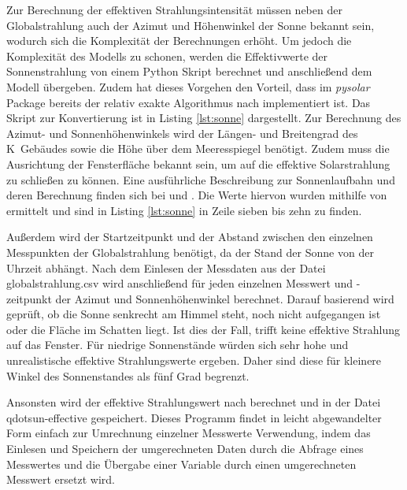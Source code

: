 Zur Berechnung der effektiven Strahlungsintensität müssen neben der Globalstrahlung auch der Azimut und Höhenwinkel der Sonne bekannt sein, wodurch sich die Komplexität der Berechnungen erhöht. Um jedoch die Komplexität des Modells zu schonen, werden die Effektivwerte der Sonnenstrahlung von einem Python Skript berechnet und anschließend dem Modell übergeben. Zudem hat dieses Vorgehen den Vorteil, dass im \textit{pysolar} Package \cite{pysolar} bereits der relativ exakte Algorithmus nach \cite{re08} implementiert ist. 
Das Skript zur Konvertierung ist in Listing \ref{lst:sonne} dargestellt. 
Zur Berechnung des Azimut- und Sonnenhöhenwinkels wird der Längen- und Breitengrad des K~Gebäudes sowie die Höhe über dem Meeresspiegel benötigt. Zudem muss die Ausrichtung der Fensterfläche bekannt sein, um auf die effektive Solarstrahlung zu schließen zu können. Eine ausführliche Beschreibung zur Sonnenlaufbahn und deren Berechnung finden sich bei \cite{qu11} und \cite{ka13}. Die Werte hiervon wurden mithilfe von \cite{go15} ermittelt und sind in Listing \ref{lst:sonne} in Zeile sieben bis zehn zu finden.



Außerdem wird der Startzeitpunkt und der Abstand zwischen den einzelnen Messpunkten der Globalstrahlung benötigt, da der Stand der Sonne von der Uhrzeit abhängt. Nach dem Einlesen der Messdaten aus der Datei globalstrahlung.csv wird anschließend für jeden einzelnen Messwert und -zeitpunkt der Azimut und Sonnenhöhenwinkel berechnet. Darauf basierend wird geprüft, ob die Sonne senkrecht am Himmel steht, noch nicht aufgegangen ist oder die Fläche im Schatten liegt. Ist dies der Fall, trifft keine effektive Strahlung auf das Fenster. Für niedrige Sonnenstände würden sich sehr hohe und unrealistische effektive Strahlungswerte ergeben. Daher sind diese für kleinere Winkel des Sonnenstandes als fünf Grad begrenzt.

Ansonsten wird der effektive Strahlungswert nach \cite[S.~67f.]{qu11} berechnet und in der Datei qdotsun-effective gespeichert. Dieses Programm findet in leicht abgewandelter Form einfach zur Umrechnung einzelner Messwerte Verwendung, indem das Einlesen und Speichern der umgerechneten Daten durch die Abfrage eines Messwertes und die Übergabe einer Variable durch einen umgerechneten Messwert ersetzt wird.

